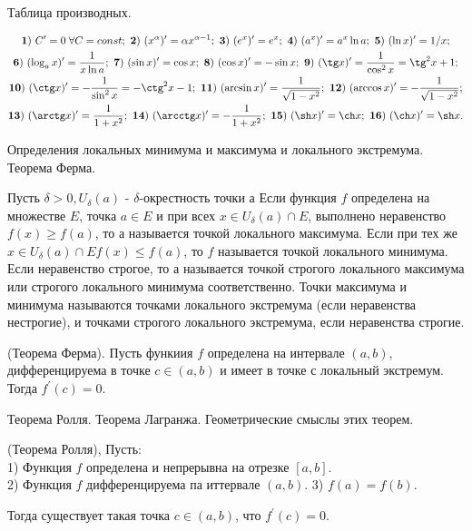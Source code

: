 \newpage

\begin{problem}
Таблица производных.
\end{problem}
\begin{multline*}
    {\bf 1)} \ C'=0\;\forall C=const; \ {\bf 2)} \ (x^{\alpha})'=
    \alpha x^{\alpha-1}; \ {\bf 3)} \ (e^x)'=e^x; \ {\bf 4)} \ (a^x)'=
    a^x\ln a; \ {\bf 5)} \ (\ln x)'=1/x;\\
    {\bf 6)} \ (\log_a x)'=
    \frac{1}{x\ln a}; \ {\bf 7)} \ (\sin x)'=\cos x; \
    {\bf 8)} \ (\cos x)'=-\sin x; \ {\bf 9)} \ (\tg x)'=
    \frac{1}{\cos^2x}=\tg^2x+1;\\
    {\bf 10)} \ (\ctg x)'=-\frac{1}{\sin^2x}=-\ctg^2x-1; \
    {\bf 11)} \ (\arcsin x)'=\frac{1}{\sqrt{1-x^2}}; \
    {\bf 12)} \ (\arccos x)'=-\frac{1}{\sqrt{1-x^2}};\\
    {\bf 13)} \ (\arctg x)'=\frac{1}{1+x^2}; \
    {\bf 14)} \ (\arcctg x)'=-\frac{1}{1+x^2}; \
    {\bf 15)} \ (\sh x)'=\ch x; \
    {\bf 16)} \ (\ch x)'=\sh x.
\end{multline*}

\newpage

\begin{problem}
Определения локальных минимума и максимума и локального экстремума. Теорема
Ферма.
\end{problem}
\begin{definition}
    Пусть $\delta>0, U_\delta(a)$ - $\delta$-окрестность точки а Если функция $f$ определена на множестве $E$, точка $a \in E$ и при всех $x \in U_\delta(a) \cap E$, выполнено неравенство $f(x) \geq f(a)$, то а называется точкой локального максимума. Если при тех же $x \in U_\delta(a) \cap E f(x) \leq f(a)$, то $f$ называется точкой локального минимума. Если неравенство строгое, то а называется точкой строгого локального максимума или строгого локального минимума соответственно. Точки максимума и минимума называются точками локального экстремума (если неравенства нестрогие), и точками строгого локального экстремума, если неравенства строгие.
\end{definition}

\begin{theorem}
    (Теорема Ферма). Пусть функиия $f$ определена на интервале $(a, b)$, дифференцируема в точке $c \in(a, b)$ и имеет в точке с локальный экстремум. Тогда $f^{\prime}(c)=0$.
\end{theorem}


\newpage

\begin{problem}
Теорема Ролля. Теорема Лагранжа. Геометрические смыслы этих теорем.
\end{problem}
\begin{theorem}
    (Теорема Ролля), Пусть:\\
    1) Функция $f$ определена и непрерывна на отрезке $[a, b]$.\\
    2) Функция $f$ дифференцируема па иттервале $(a, b)$.
    3) $f(a)=f(b)$.

    Тогда существует такая точка $c \in(a, b)$, что $f^{\prime}(c)=0$.
\end{theorem}

